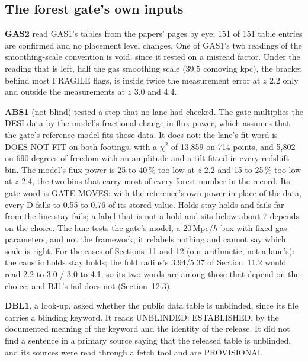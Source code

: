 \documentclass[10pt]{article}
\begin{document}
\subsection{The forest gate's own inputs}
\textbf{GAS2} read GAS1's tables from the papers' pages by eye: 151 of 151 table entries are confirmed and no placement level changes. One of GAS1's two readings of the smoothing-scale convention is void, since it rested on a misread factor. Under the reading that is left, half the gas smoothing scale (39.5 comoving kpc), the bracket behind most FRAGILE flags, is inside twice the measurement error at $z$ 2.2 only and outside the measurements at $z$ 3.0 and 4.4.

\textbf{ABS1} (not blind) tested a step that no lane had checked. The gate multiplies the DESI data by the model's fractional change in flux power, which assumes that the gate's reference model fits those data. It does not: the lane's fit word is DOES NOT FIT on both footings, with a $\chi^2$ of 13,859 on 714 points, and 5,802 on 690 degrees of freedom with an amplitude and a tilt fitted in every redshift bin. The model's flux power is 25 to 40\,\% too low at $z$ 2.2 and 15 to 25\,\% too low at $z$ 2.4, the two bins that carry most of every forest number in the record. Its gate word is GATE MOVES: with the reference's own power in place of the data, every D falls to 0.55 to 0.76 of its stored value. Holds stay holds and fails far from the line stay fails; a label that is not a hold and sits below about 7 depends on the choice. The lane tests the gate's model, a 20\,Mpc/$h$ box with fixed gas parameters, and not the framework; it relabels nothing and cannot say which scale is right. For the cases of Sections~11 and 12 (our arithmetic, not a lane's): the caustic holds stay holds; the fold radius's 3.94/5.37 of Section~11.2 would read 2.2 to 3.0 / 3.0 to 4.1, so its two words are among those that depend on the choice; and BJ1's fail does not (Section~12.3).

\textbf{DBL1}, a look-up, asked whether the public data table is unblinded, since its file carries a blinding keyword. It reads UNBLINDED: ESTABLISHED, by the documented meaning of the keyword and the identity of the release. It did not find a sentence in a primary source saying that the released table is unblinded, and its sources were read through a fetch tool and are PROVISIONAL.
\end{document}
